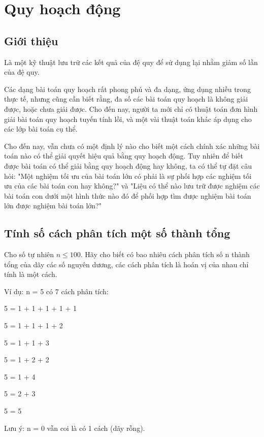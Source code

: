 \chapter{Quy hoạch động}
\section{Giới thiệu}
Là một kỹ thuật lưu trữ các kết quả của đệ quy để sử dụng lại nhằm giảm số lần của đệ quy.

Các dạng bài toán quy hoạch rất phong phú và đa dạng, ứng dụng nhiều trong thực tế, nhưng cũng cần biết rằng, đa số các bài toán quy hoạch là không giải được, hoặc chưa giải được. Cho đến nay, người ta mới chỉ có thuật toán đơn hình giải bài toán quy hoạch tuyến tính lồi, và một vài thuật toán khác áp dụng cho các lớp bài toán cụ thể.

Cho đến nay, vẫn chưa có một định lý nào cho biết một cách chính xác những bài toán nào có thể giải quyết hiệu quả bằng quy hoạch động. Tuy nhiên để biết được bài toán có thể giải bằng quy hoạch động hay không, ta có thể tự đặt câu hỏi: "Một nghiệm tối ưu của bài toán lớn có phải là sự phối hợp các nghiệm tối ưu của các bài toán con hay không?" và "Liệu có thể nào lưu trữ được nghiệm các bài toán con dưới một hình thức nào đó để phối hợp tìm được nghiệm bài toán lớn được nghiệm bài toán lớn?"
\section{Tính số cách phân tích một số thành tổng}
Cho số tự nhiên $n\leq100$. Hãy cho biết có bao nhiêu cách phân tích số n thành tổng của dãy các số nguyên dương, các cách phân tích là hoán vị của nhau chỉ tính là một cách.

Ví dụ: n = 5 có 7 cách phân tích:
\begin{enumerate}
    \begin{multicols}{2}
        \item 5 = 1 + 1 + 1 + 1 + 1
        \item 5 = 1 + 1 + 1 + 2
        \item 5 = 1 + 1 + 3
        \item 5 = 1 + 2 + 2
        \item 5 = 1 + 4
        \item 5 = 2 + 3
        \item 5 = 5
    \end{multicols}
\end{enumerate}

Lưu ý: n = 0 vẫn coi là có 1 cách (dãy rỗng).

